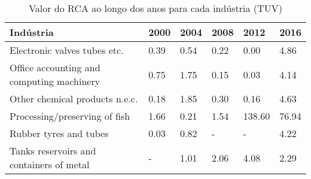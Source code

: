 \begin{table}
\centering
\caption{Valor do RCA ao longo dos anos para cada indústria (TUV)}
\label{tab:ex3-tempo-TUV}
\begin{tabular}{p{6cm}p{1.5cm}p{1.5cm}p{1.5cm}p{1.5cm}p{1.5cm}}
\toprule
                                Indústria & 2000 & 2004 & 2008 &   2012 &  2016 \\
\midrule
             Electronic valves tubes etc. & 0.39 & 0.54 & 0.22 &   0.00 &  4.86 \\
Office accounting and computing machinery & 0.75 & 1.75 & 0.15 &   0.03 &  4.14 \\
           Other chemical products n.e.c. & 0.18 & 1.85 & 0.30 &   0.16 &  4.63 \\
            Processing/preserving of fish & 1.66 & 0.21 & 1.54 & 138.60 & 76.94 \\
                   Rubber tyres and tubes & 0.03 & 0.82 &    - &      - &  4.22 \\
 Tanks reservoirs and containers of metal &    - & 1.01 & 2.06 &   4.08 &  2.29 \\
\bottomrule
\end{tabular}
\end{table}
